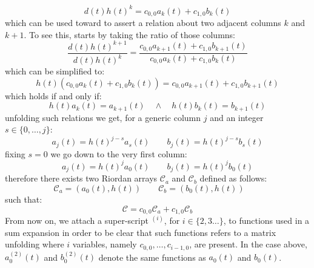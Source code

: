 \begin{equation} 
    d(t)h(t)^{k} = c_{0,0}a_{k}(t) + c_{1,0}b_{k}(t)
    \label{eq:two:splitted:catalan:generic:column:relation}
\end{equation} 
which can be used toward to assert a relation about two adjacent columns $k$ and $k+1$. 
To see this, starts by taking the ratio of those columns:
\begin{displaymath} 
    \frac{d(t)h(t)^{k+1}}{d(t)h(t)^{k}} = \frac{c_{0,0}a_{k+1}(t) + c_{1,0}b_{k+1}(t)}
        {c_{0,0}a_{k}(t) + c_{1,0}b_{k}(t)}
\end{displaymath} 
which can be simplified to:
\begin{displaymath} 
    h(t)\left(c_{0,0}a_{k}(t) + c_{1,0}b_{k}(t)\right) = 
        c_{0,0}a_{k+1}(t) + c_{1,0}b_{k+1}(t)
\end{displaymath} 
which holds if and only if:
\begin{displaymath} 
    h(t) a_{k}(t) = a_{k+1}(t) \quad \wedge \quad h(t) b_{k}(t) = b_{k+1}(t)
\end{displaymath} 
unfolding such relations we get, for a generic column $j$ and an integer $s\in\lbrace 0,\ldots,j\rbrace$:
\begin{displaymath} 
    a_{j}(t) = h(t)^{j-s} a_{s}(t) \quad \quad 
    b_{j}(t) = h(t)^{j-s} b_{s}(t)
\end{displaymath} 
fixing $s=0$ we go down to the very first column:
\begin{displaymath} 
    a_{j}(t) = h(t)^{j} a_{0}(t) \quad \quad 
    b_{j}(t) = h(t)^{j} b_{0}(t)
\end{displaymath} 
therefore there exists two Riordan arrays $\mathcal{C}_{a}$ and $\mathcal{C}_{b}$
defined as follows:
\begin{displaymath} 
    \mathcal{C}_{a} = \left(a_{0}(t), h(t)\right) \quad \quad 
    \mathcal{C}_{b} = \left(b_{0}(t), h(t)\right) \quad \quad 
\end{displaymath} 
such that:
\begin{equation} 
    \mathcal{C} = c_{0,0}\mathcal{C}_{a} + c_{1,0}\mathcal{C}_{b}
    \label{eq:two:splitted:catalan:riordan:expansion}
\end{equation} 
From now on, we attach a super-script $^{(i)}$, for $i\in\lbrace 2,3\ldots\rbrace$, 
to functions used in a sum expansion in order to be clear that such functions 
refers to a matrix unfolding where $i$ variables, namely $c_{0,0},\ldots,c_{i-1,0}$, 
are present. In the case above, $a_{0}^{(2)}(t)$ and $b_{0}^{(2)}(t)$ 
denote the same functions as $a_{0}(t)$ and $b_{0}(t)$.


